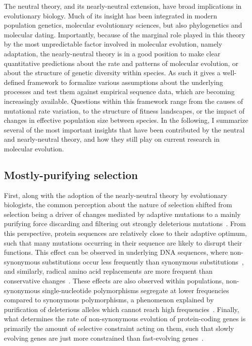 The neutral theory, and its nearly-neutral extension, have broad implications in evolutionary biology.
Much of its insight has been integrated in modern population genetics, molecular evolutionary sciences, but also phylogenetics and molecular dating.
Importantly, because of the marginal role played in this theory by the most unpredictable factor involved in molecular evolution, namely adaptation, the nearly-neutral theory is in a good position to make clear quantitative predictions about the rate and patterns of molecular evolution, or about the structure of genetic diversity within species.
As such it gives a well-defined framework to formalize various assumptions about the underlying processes and test them against empirical sequence data, which are becoming increasingly available.
Questions within this framework range from the causes of mutational rate variation, to the structure of fitness landscapes, or the impact of changes in effective population size between species.
In the following, I summarize several of the most important insights that have been contributed by the neutral and nearly-neutral theory, and how they still play on current research in molecular evolution.

\subsection{Mostly-purifying selection}
\label{subsec:mostly-purifying-selection}

First, along with the adoption of the nearly-neutral theory by evolutionary biologists, the common perception about the nature of selection shifted from selection being a driver of changes mediated by adaptive mutations to a mainly purifying force discarding and filtering out strongly deleterious mutations~\citep{Lynch2007}.
From this perspective, protein sequences are relatively close to their adaptive optimum, such that many mutations occurring in their sequence are likely to disrupt their functions.
This effect can be observed in underlying DNA sequences, where non-synonymous substitutions occur less frequently than synonymous substitutions~\citep{King1969}, and similarly, radical amino acid replacements are more frequent than conservative changes~\citep{kimura1983neutral}.
These effects are also observed within populations, non-synonymous single-nucleotide polymorphisms segregate at lower frequencies compared to synonymous polymorphisms, a phenomenon explained by purification of deleterious alleles which cannot reach high frequencies~\citep{Akashi1999, Cargill1999, Hughes2005}.
Finally, what determines the rate of non-synonymous evolution of protein-coding genes is primarily the amount of selective constraint acting on them, such that slowly evolving genes are just more constrained than fast-evolving genes~\citet{kimura1983neutral}.

